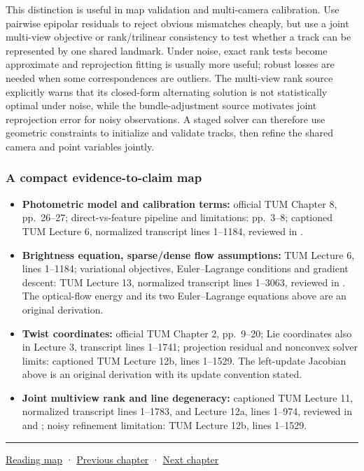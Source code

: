 This distinction is useful in map validation and multi-camera calibration. Use pairwise epipolar residuals to reject obvious mismatches cheaply, but use a joint multi-view objective or rank/trilinear consistency to test whether a track can be represented by one shared landmark. Under noise, exact rank tests become approximate and reprojection fitting is usually more useful; robust losses are needed when some correspondences are outliers. The multi-view rank source explicitly warns that its closed-form alternating solution is not statistically optimal under noise, while the bundle-adjustment source motivates joint reprojection error for noisy observations. A staged solver can therefore use geometric constraints to initialize and validate tracks, then refine the shared camera and point variables jointly.

\subsubsection{A compact evidence-to-claim map}\label{02-foundations-ii-ch036-a-compact-evidence-to-claim-map}

\hypertarget{02-foundations-ii-ch036-a-compact-evidence-to-claim-map}{}

\begin{itemize}
\tightlist
\item
  \textbf{Photometric model and calibration terms:} official TUM Chapter 8, pp.~26--27; direct-vs-feature pipeline and limitations: pp.~3--8; captioned TUM Lecture 6, normalized transcript lines 1--1184, reviewed in .
\item
  \textbf{Brightness equation, sparse/dense flow assumptions:} TUM Lecture 6, lines 1--1184; variational objectives, Euler--Lagrange conditions and gradient descent: TUM Lecture 13, normalized transcript lines 1--3063, reviewed in . The optical-flow energy and its two Euler--Lagrange equations above are an original derivation.
\item
  \textbf{Twist coordinates:} official TUM Chapter 2, pp.~9--20; Lie coordinates also in Lecture 3, transcript lines 1--1741; projection residual and nonconvex solver limits: captioned TUM Lecture 12b, lines 1--1529. The left-update Jacobian above is an original derivation with its update convention stated.
\item
  \textbf{Joint multiview rank and line degeneracy:} captioned TUM Lecture 11, normalized transcript lines 1--1783, and Lecture 12a, lines 1--974, reviewed in  and ; noisy refinement limitation: TUM Lecture 12b, lines 1--1529.
\end{itemize}

\begin{center}\rule{0.5\linewidth}{0.5pt}\end{center}

\hyperref[volume-reading-map]{Reading map} · \hyperref[02-foundations-ii-ch035-camera-extrinsics-and-projection-geometry]{Previous chapter} · \hyperref[02-foundations-ii-ch037-camera-contracts-and-transform-chain-debugging]{Next chapter}
